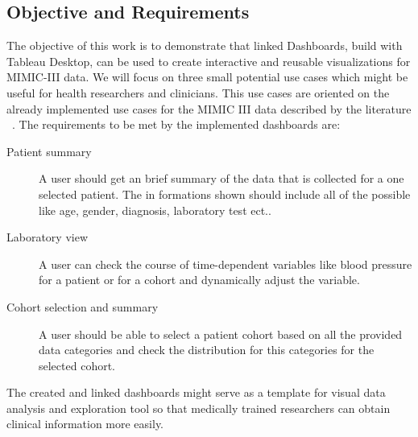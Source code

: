 \documentclass[aac,crcready]{iosart2x}
\begin{document}
\subsection{Objective and Requirements}\label{s1.2}
%
The objective of this work is to demonstrate that linked Dashboards, build with Tableau Desktop, can be used to create interactive and reusable visualizations for MIMIC-III data. We will focus on three small potential use cases which might be useful for health researchers and clinicians. This use cases are oriented on the already implemented use cases for the MIMIC III data described by the literature ~\cite{Lee.2016, Festag.2019}.
The requirements to be met by the implemented dashboards are:
\begin{description}
\item[Patient summary] A user should get an brief summary of the data that is collected for a one selected patient. The in formations shown should include all of the possible   like age, gender, diagnosis, laboratory test ect..
\item[Laboratory view] A user can check the course of time-dependent variables like blood pressure for a patient or for a cohort and dynamically adjust the variable.
\item[Cohort selection and summary] A user should be able to select a patient cohort based on all the provided data categories and check the distribution for this categories for the selected cohort.
\end{description}

The created and linked dashboards might serve as a template for visual data analysis and exploration tool so that medically trained researchers can obtain clinical information more easily.
\end{document}
